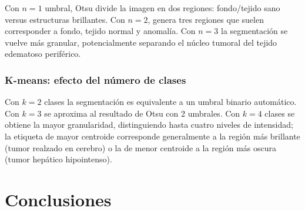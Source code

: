 \documentclass[12pt, a4paper]{article}
\begin{document}
Con $n=1$ umbral, Otsu divide la imagen en dos regiones: fondo/tejido sano versus
estructuras brillantes. Con $n=2$, genera tres regiones que suelen corresponder a
fondo, tejido normal y anomalía. Con $n=3$ la segmentación se vuelve más granular,
potencialmente separando el núcleo tumoral del tejido edematoso periférico.

\subsubsection{K-means: efecto del número de clases}

Con $k=2$ clases la segmentación es equivalente a un umbral binario automático. Con
$k=3$ se aproxima al resultado de Otsu con 2 umbrales. Con $k=4$ clases se obtiene la
mayor granularidad, distinguiendo hasta cuatro niveles de intensidad; la etiqueta de
mayor centroide corresponde generalmente a la región más brillante (tumor realzado en
cerebro) o la de menor centroide a la región más oscura (tumor hepático hipointenso).

\section{Conclusiones}
\end{document}
